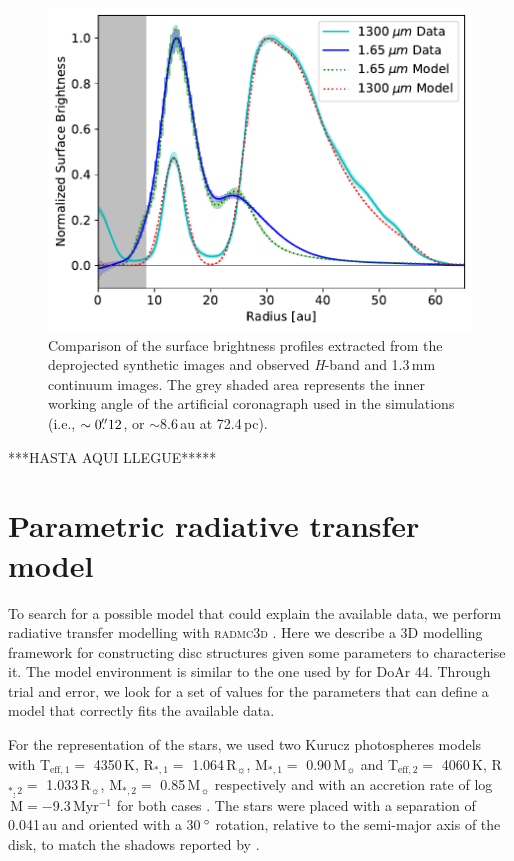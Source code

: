 \documentclass[letters,usenatbib,times]{mnras}
\begin{document}
\begin{figure}
	\includegraphics[width=\columnwidth]{comp_fig_all_profiles_au.pdf}
    \caption{Comparison of the surface brightness profiles extracted from the deprojected synthetic images and observed \textit{H}-band and 1.3\,mm continuum images. The grey shaded area represents the inner working angle of the artificial coronagraph used in the simulations (i.e., $\sim0\hbox{$.\!\!^{\prime\prime}$} 12$, or $\sim$8.6\,au at 72.4\,pc).}
    \label{fig:radprofiles}
\end{figure}



***HASTA AQUI LLEGUE*****
\section{Parametric radiative transfer model} \label{sec:model}

To search for a possible model that could explain the available data, we perform radiative transfer modelling with \textsc{radmc3d} \citep{Dullemond_2012}. Here we describe a 3D modelling framework for constructing disc structures given some parameters to characterise it. The model environment is similar to the one used by \citet{2018MNRAS.477.5104C} for DoAr 44. Through trial and error, we look for a set of values for the parameters that can define a model that correctly fits the available data.

For the representation of the stars, we used two Kurucz photospheres models \citep{1979ApJS...40....1K, 1997A&A...318..841C} with T$_{\mathrm{eff},1} =$ 4350\,K, R$_{*,1} =$ 1.064\,R$_{\sun}$, M$_{*,1} =$ 0.90\,M$_{\sun}$ and T$_{\mathrm{eff},2} =$ 4060\,K, R$_{*,2} =$ 1.033\,R$_{\sun}$, M$_{*,2} =$ 0.85\,M$_{\sun}$ respectively and with an accretion rate of log$\,\dot{\mathrm{M}} = -$9.3\,Myr$^{-1}$ for both cases \citep{10.1111/j.1365-2966.2011.19366.x}. The stars were placed with a separation of 0.041\,au and oriented with a 30\,$\hbox{$^\circ$}$ rotation, relative to the semi-major axis of the disk, to match the shadows reported by \citet{dOrazi}.
\end{document}
